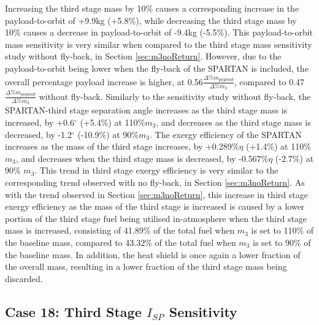 Increasing the third stage mass by 10\% causes a corresponding increase in the payload-to-orbit of +9.9kg (+5.8\%), while decreasing the third stage mass by 10\% causes a decrease in payload-to-orbit of -9.4kg (-5.5\%). 
This payload-to-orbit mass sensitivity is very similar when compared to the third stage mass sensitivity study without fly-back, in Section \ref{sec:m3noReturn}. However, due to the payload-to-orbit being lower when the fly-back of the SPARTAN is included, the overall percentage payload increase is higher, at 0.56$\frac{\Delta\%m_{payload}}{\Delta\%m_3}$, compared to 0.47$\frac{\Delta\%m_{payload}}{\Delta\%m_3}$ without fly-back. 
Similarly to the sensitivity study without fly-back, the SPARTAN-third stage separation angle increases as the third stage mass is increased, by +0.6$^\circ$ (+5.4\%) at 110\%$m_3$, and decreases as the third stage mass is decreased, by -1.2$^\circ$ (-10.9\%) at 90\%$m_3$. 
The exergy efficiency of the SPARTAN increases as the mass of the third stage increases, by +0.289\%$\eta$ (+1.4\%) at 110\% $m_3$, and decreases when the third stage mass is decreased, by -0.567\%$\eta$ (-2.7\%) at 90\% $m_3$.
This trend in third stage exergy efficiency is very similar to the corresponding trend observed with no fly-back, in Section \ref{sec:m3noReturn}.
As with the trend observed in Section \ref{sec:m3noReturn}, this increase in third stage exergy efficiency as the mass of the third stage is increased is caused by a lower portion of the third stage fuel being utilised in-atmosphere when the third stage mass is increased, consisting of 41.89\% of the total fuel when $m_3$ is set to 110\% of the baseline mass, compared to 43.32\% of the total fuel when $m_3$ is set to 90\% of the baseline mass. 
In addition, the heat shield is once again a lower fraction of the overall mass, resulting in a lower fraction of the third stage mass being discarded. 

\subsection{Case 18: Third Stage $I_{SP}$ Sensitivity}


